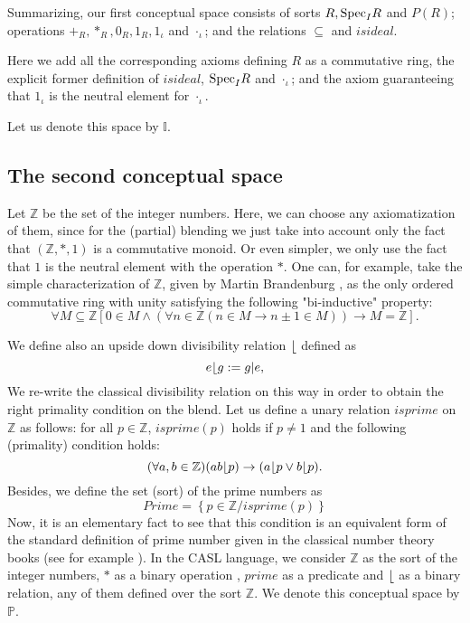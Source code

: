 Summarizing, our first conceptual space consists of sorts $R, {\rm Spec}_IR$ and $P(R)$; operations $+_R, *_R, 0_R, 1_R, 1_{\iota}$ and $
\cdot_{\iota}$; and the relations $\subseteq$ and $isideal$.

Here we add all the corresponding axioms defining $R$ as a commutative ring, the explicit former definition of $isideal$, ${\rm Spec}_IR$ and $\cdot_{\iota}$; and the axiom guaranteeing that  $1_{\iota}$ is the neutral element for $\cdot_{\iota}$.
 
Let us denote this space by $\mathbb{I}$.

\subsection{The second conceptual space}
Let $\mathbb{Z}$ be the set of the integer numbers. Here, we can
choose any axiomatization of them, since for the (partial) blending we
just take into account only the fact that $(\mathbb{Z},*,1)$ is a
commutative monoid. Or even simpler, we only use the fact that $1$ is
the neutral element with the operation $*$. One can, for example, take
the simple characterization of $\mathbb{Z}$, given by Martin
Brandenburg \cite{brandenburgdobleinduction}, as the only ordered
commutative ring with unity satisfying the following "bi-inductive"
property:
\[\forall M \subseteq \mathbb{Z} \left[ 0 \in M \wedge \left(\forall n \in \mathbb{Z} \left(n\in M \rightarrow n\pm 1 \in M\right)\right) \rightarrow M=\mathbb{Z}\right].\]

We define also an upside down divisibility relation $\lfloor$ defined as 
%
\[e\lfloor g:=g|e,\] We re-write the classical divisibility relation
on this way in order to obtain the right primality condition on the
blend.  Let us define a unary relation $isprime$ on $\mathbb{Z}$ as
follows: for all $p\in \mathbb{Z}$, $isprime(p)$ holds if $p\neq 1$
and the following (primality) condition holds:
%
\[(\forall a,b\in \mathbb{Z})(ab \lfloor p)\rightarrow (a \lfloor p \vee b \lfloor p).\] 
Besides, we define the set (sort) of the prime numbers as 
\[ Prime=\left\{ p\in \mathbb{Z}/ isprime(p)\right\}\] Now, it is an
elementary fact to see that this condition is an equivalent form of
the standard definition of prime number given in the classical number
theory books (see for example \textcite{Apostol76}). In the CASL
language, we consider $\mathbb{Z}$ as the sort of the integer numbers,
$*$ as a binary operation , $prime$ as a predicate and $\lfloor$
  as a binary relation, any of them defined over the sort
  $\mathbb{Z}$.  \newline\indent We denote this conceptual space by
  $\mathbb{P}$.

